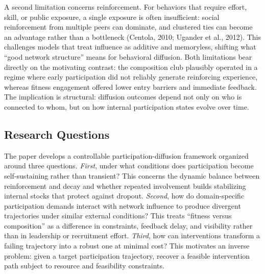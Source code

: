 \documentclass[11pt]{article}
\begin{document}
A second limitation concerns reinforcement. For behaviors that require effort, skill, or public exposure, a single exposure is often insufficient: social reinforcement from multiple peers can dominate, and clustered ties can become an advantage rather than a bottleneck (Centola, 2010; Ugander et al., 2012). This challenges models that treat influence as additive and memoryless, shifting what ``good network structure'' means for behavioral diffusion. Both limitations bear directly on the motivating contrast: the composition club plausibly operated in a regime where early participation did not reliably generate reinforcing experience, whereas fitness engagement offered lower entry barriers and immediate feedback. The implication is structural: diffusion outcomes depend not only on who is connected to whom, but on how internal participation states evolve over time.

\subsection{Research Questions}
The paper develops a controllable participation-diffusion framework organized around three questions. \emph{First}, under what conditions does participation become self-sustaining rather than transient? This concerns the dynamic balance between reinforcement and decay and whether repeated involvement builds stabilizing internal stocks that protect against dropout. \emph{Second}, how do domain-specific participation demands interact with network influence to produce divergent trajectories under similar external conditions? This treats ``fitness versus composition'' as a difference in constraints, feedback delay, and visibility rather than in leadership or recruitment effort. \emph{Third}, how can interventions transform a failing trajectory into a robust one at minimal cost? This motivates an inverse problem: given a target participation trajectory, recover a feasible intervention path subject to resource and feasibility constraints.
\end{document}
